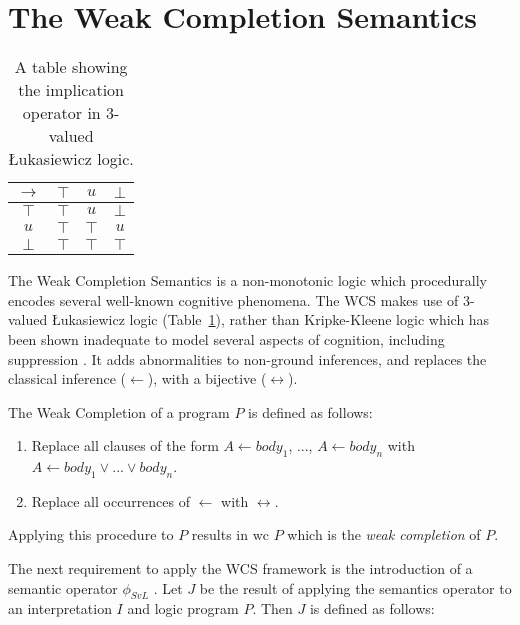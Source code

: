 \section{The Weak Completion Semantics} \label{ssec:wcs}
\begin{table}
\begin{center}
\begin{tabular}{ c | c c c }
  $\rightarrow$& $\top$ & $u$ & $\bot$ \\ \hline
 $\top$ & $\top$ & $u$ & $\bot$ \\  
 $u$ & $\top$ & $\top$ & $u$\\  
 $\bot$ & $\top$ & $\top$ & $\top$
\end{tabular}
\caption{A table showing the implication operator in 3-valued \L ukasiewicz logic.}
\label{tbl:luk}
\end{center}
\end{table}

The Weak Completion Semantics is a non-monotonic logic which procedurally encodes several well-known cognitive phenomena. The WCS makes use of 3-valued \L ukasiewicz logic (Table~\ref{tbl:luk}), rather than Kripke-Kleene logic which has been shown inadequate to model several aspects of cognition, including suppression \citep{dietz2012computational}. It adds abnormalities to non-ground inferences, and replaces the classical inference ($\leftarrow$), with a bijective ($\leftrightarrow$). 

The Weak Completion of a program $P$ is defined as follows:

\begin{enumerate}
\item Replace all clauses of the form $A \leftarrow body_1$, ..., $A \leftarrow body_n$ with $A \leftarrow body_1 \lor ... \lor body_n$.
\item Replace all occurrences of $\leftarrow$ with $\leftrightarrow$.
\end{enumerate}

Applying this procedure to $P$ results in $\text{wc }P$ which is the \textit{weak completion} of $P$.

The next requirement to apply the WCS framework is the introduction of a semantic operator $\phi_{SvL}$ \citep{stenning2008interpretation}. Let $J$ be the result of applying the semantics operator to an interpretation $I$ and logic program $P$. Then $J$ is defined as follows:

